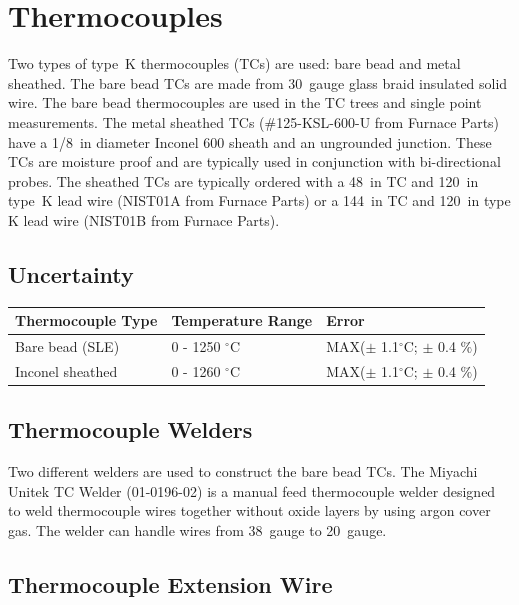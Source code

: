 \documentclass[11pt,oneside]{book}
\begin{document}
\chapter{Thermocouples}
\label{chap:thermocouple}

Two types of type~K thermocouples (TCs) are used: bare bead and metal sheathed. The bare bead TCs are made from 30~gauge glass braid insulated solid wire. The bare bead thermocouples are used in the TC trees and single point measurements. The metal sheathed TCs (\#125-KSL-600-U from Furnace Parts) have a 1/8~in diameter Inconel 600 sheath and an ungrounded junction. These TCs are moisture proof and are typically used in conjunction with bi-directional probes. The sheathed TCs are typically ordered with a 48~in TC and 120~in type~K lead wire (NIST01A from Furnace Parts) or a 144~in TC and 120~in type K lead wire (NIST01B from Furnace Parts).

\section{Uncertainty}

\begin{table}[h!]
\centering
{}\label{tab:TC_uncertain}
\begin{tabular}{lll}
\toprule[1.5pt]
Thermocouple Type  &  Temperature Range     &  Error                                      \\
\midrule
Bare bead (SLE)    &  0 - 1250 $^{\circ}$C  &  MAX($\pm$ 1.1$^{\circ}$C; $\pm$ 0.4 $\%$)  \\
Inconel sheathed   &  0 - 1260 $^{\circ}$C  &  MAX($\pm$ 1.1$^{\circ}$C; $\pm$ 0.4 $\%$)  \\
\bottomrule[1.25pt]
\end{tabular}\par
\end{table}

\section{Thermocouple Welders}

Two different welders are used to construct the bare bead TCs. The Miyachi Unitek TC Welder (01-0196-02) is a manual feed thermocouple welder designed to weld thermocouple wires together without oxide layers by using argon cover gas. The welder can handle wires from 38~gauge to 20~gauge. 

\section{Thermocouple Extension Wire}
\end{document}
